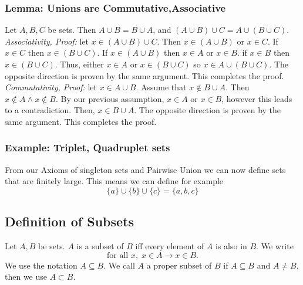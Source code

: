 \documentclass[]{scrbook}
\begin{document}
\subsubsection{Lemma: Unions are Commutative,Associative}
Let $A, B, C$ be sets. Then $A \cup B = B \cup A$, and $(A\cup B)\cup C = A\cup(B\cup C)$.\\
\textit{Associativity, Proof:} let $x\in (A\cup B)\cup C$. Then $x\in (A\cup B)$ or $x\in C$. If $x\in C$ then $x\in(B\cup C)$. If $x\in(A\cup B)$ then $x\in A$ or $x\in B$. if $x\in B$ then $x\in (B\cup C)$. Thus, either $x\in A$ or $x\in(B\cup C)$ so $x\in A\cup(B\cup C)$. The opposite direction is proven by the same argument. This completes the proof.\\
\textit{Commutativity, Proof:} let $x\in A\cup B$. Assume that $x\notin B\cup A$. Then $x\notin A \wedge x\notin B$. By our previous assumption, $x\in A$ or $x\in B$, however this leads to a contradiction. Then, $x\in B\cup A$. The opposite direction is proven by the same argument. This completes the proof.

\subsubsection{Example: Triplet, Quadruplet sets}

From our Axioms of singleton sets and Pairwise Union we can now define sets that are finitely large. This means we can define for example
\begin{equation}
	\{a\} \cup \{b\} \cup \{c\} = \{a,b,c\}
\end{equation}

\subsection{Definition of Subsets}
Let $A,B$ be sets. $A$ is a subset of $B$ iff every element of $A$ is also in $B$. We write
\begin{equation}
	\text{for all }x,\; x\in A \rightarrow x\in B.
\end{equation}
We use the notation $A\subseteq B$. We call $A$ a proper subset of $B$ if $A\subseteq B$ and $A\neq B$, then we use $A \subset B$.
\end{document}
